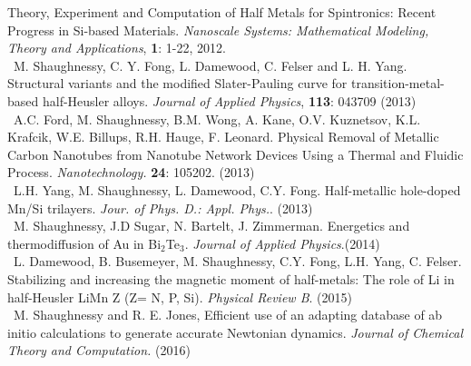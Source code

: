 \documentclass[11pt, a4paper]{article}
\newcommand{\years}[1]{\marginnote{\scriptsize #1}}
\begin{document}
{{Theory, Experiment and Computation of Half Metals for Spintronics: Recent Progress in Si-based Materials.} \emph{Nanoscale Systems: Mathematical Modeling, Theory and Applications},  \textbf{1}: 1-22,  2012. \\
\years{2013} \   M. Shaughnessy, C. Y. Fong, L. Damewood, C. Felser and L. H. Yang. %
{Structural variants and the modified Slater-Pauling curve for transition-metal-based half-Heusler alloys.} \emph{Journal of Applied Physics}, \textbf{113}: 043709 (2013) \\
\years{    } \   A.C. Ford, M. Shaughnessy, B.M. Wong, A. Kane, O.V. Kuznetsov, K.L. Krafcik, W.E. Billups, R.H. Hauge, F. Leonard. %
{Physical Removal of Metallic Carbon Nanotubes from Nanotube Network Devices Using a Thermal and Fluidic Process.} \emph{Nanotechnology.} \textbf{24}: 105202. (2013) \\
\years{    } \    L.H. Yang, M. Shaughnessy, L. Damewood, C.Y. Fong. %
{Half-metallic hole-doped Mn/Si trilayers.} 
\emph{Jour. of Phys. D.: Appl. Phys.}. (2013)\\
\years{2014} \   M. Shaughnessy, J.D Sugar, N. Bartelt, J. Zimmerman. {Energetics and thermodiffusion of Au in Bi$_2$Te$_3$.} \emph{Journal of Applied Physics}.(2014)\\
\years{2015} \  L. Damewood, B. Busemeyer, M. Shaughnessy, C.Y. Fong, L.H. Yang, C. Felser. {Stabilizing and increasing the magnetic moment of half-metals: The role of Li in half-Heusler LiMn Z (Z= N, P, Si)}. \emph{Physical Review B}. (2015)\\
\years{2016} \  M. Shaughnessy and R. E. Jones, {Efficient use of an adapting database of ab initio calculations to generate accurate Newtonian dynamics}.  \emph{Journal of Chemical Theory and Computation.} (2016)


}
\end{document}
